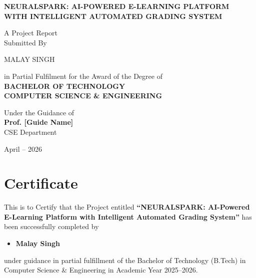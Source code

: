 \documentclass[12pt,a4paper]{report}
\begin{document}
\begin{titlepage}
    \centering
    \vspace*{1cm}
    {\Large\bfseries NEURALSPARK: AI-POWERED E-LEARNING PLATFORM\\[0.3cm]
    WITH INTELLIGENT AUTOMATED GRADING SYSTEM\par}
    \vspace{1.5cm}
    {\large A Project Report\\[0.2cm]
    Submitted By\par}
    \vspace{0.8cm}
    {\large
    MALAY SINGH\par}
    \vspace{1.5cm}
    {\normalsize in Partial Fulfilment for the Award of the Degree of\\[0.3cm]
    \textbf{BACHELOR OF TECHNOLOGY}\\[0.2cm]
    \textbf{COMPUTER SCIENCE \& ENGINEERING}\par}
    \vspace{1.5cm}
    {\normalsize Under the Guidance of\\[0.2cm]
    \textbf{Prof. [Guide Name]}\\[0.1cm]
    CSE Department\par}
    \vspace{2cm}
    {\normalsize April -- 2026\par}
    \vfill
\end{titlepage}

\chapter*{Certificate}
\thispagestyle{plain}
\setcounter{page}{2}

\noindent This is to Certify that the Project entitled \textbf{``NEURALSPARK: AI-Powered E-Learning Platform with Intelligent Automated Grading System''} has been successfully completed by

\begin{itemize}
    \item \textbf{Malay Singh}
\end{itemize}

\noindent under guidance in partial fulfillment of the Bachelor of Technology (B.Tech) in Computer Science \& Engineering in Academic Year 2025--2026.
\end{document}
